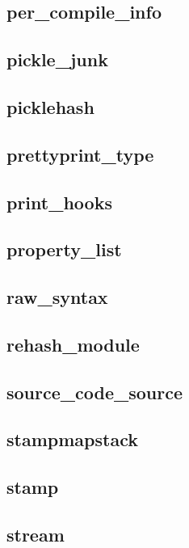 \subsection{per\_compile\_info}					
\subsection{pickle\_junk}					
\subsection{picklehash}						
\subsection{prettyprint\_type}					
\subsection{print\_hooks}					
\subsection{property\_list}					
\subsection{raw\_syntax}					
\subsection{rehash\_module}					
\subsection{source\_code\_source}				
\subsection{stampmapstack}					
\subsection{stamp}						
\subsection{stream}						
